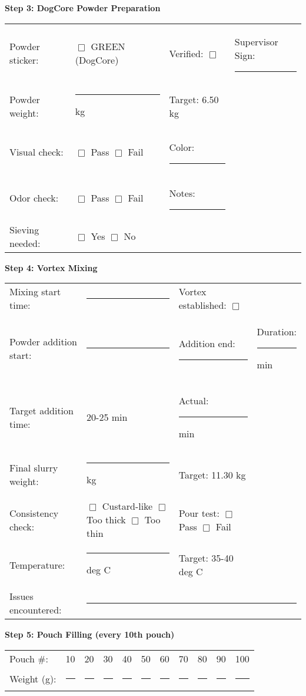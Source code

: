\vspace{1em}

\noindent\textbf{Step 3: DogCore Powder Preparation}

\begin{tabular}{@{}lp{3cm}p{3cm}p{3cm}@{}}
Powder sticker: & $\Box$ GREEN (DogCore) & Verified: $\Box$ & Supervisor Sign: \rule{2cm}{0.4pt} \\
Powder weight: & \rule{2.5cm}{0.4pt} kg & Target: 6.50 kg & \\
Visual check: & $\Box$ Pass $\Box$ Fail & Color: \rule{2cm}{0.4pt} & \\
Odor check: & $\Box$ Pass $\Box$ Fail & Notes: \rule{3cm}{0.4pt} & \\
Sieving needed: & $\Box$ Yes $\Box$ No & & \\
\end{tabular}

\vspace{1em}

\noindent\textbf{Step 4: Vortex Mixing}

\begin{tabular}{@{}lp{3cm}p{3cm}p{3cm}@{}}
Mixing start time: & \rule{2.5cm}{0.4pt} & Vortex established: $\Box$ & \\
Powder addition start: & \rule{2.5cm}{0.4pt} & Addition end: \rule{2.5cm}{0.4pt} & Duration: \rule{1.5cm}{0.4pt} min \\
Target addition time: & 20-25 min & Actual: \rule{2cm}{0.4pt} min & \\
Final slurry weight: & \rule{2.5cm}{0.4pt} kg & Target: 11.30 kg & \\
Consistency check: & $\Box$ Custard-like $\Box$ Too thick $\Box$ Too thin & Pour test: $\Box$ Pass $\Box$ Fail & \\
Temperature: & \rule{2.5cm}{0.4pt} deg C & Target: 35-40 deg C & \\
Issues encountered: & \multicolumn{3}{l}{\rule{9cm}{0.4pt}} \\
\end{tabular}

\vspace{1em}

\noindent\textbf{Step 5: Pouch Filling (every 10th pouch)}

\begin{tabular}{@{}lcccccccccc@{}}
Pouch \#: & 10 & 20 & 30 & 40 & 50 & 60 & 70 & 80 & 90 & 100 \\
Weight (g): & \rule{1cm}{0.4pt} & \rule{1cm}{0.4pt} & \rule{1cm}{0.4pt} & \rule{1cm}{0.4pt} & \rule{1cm}{0.4pt} & \rule{1cm}{0.4pt} & \rule{1cm}{0.4pt} & \rule{1cm}{0.4pt} & \rule{1cm}{0.4pt} & \rule{1cm}{0.4pt} \\
\end{tabular}

